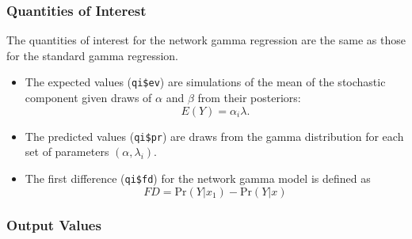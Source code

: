 \subsubsection{Quantities of Interest} 
The quantities of interest for the network gamma regression are the same as those for the standard gamma regression.  
\begin{itemize} 
\item The expected values ({\tt qi\$ev}) are simulations of the mean of the stochastic component given draws of $\alpha$ and $\beta$ from their posteriors:    
\begin{equation*} 
E(Y) = \alpha_i \lambda. 
\end{equation*} 
 
\item The predicted values ({\tt qi\$pr}) are draws from the gamma distribution for each set of parameters $(\alpha, \lambda_i)$.  
 
\item The first difference ({\tt qi\$fd}) for the network gamma model is defined as  
\begin{equation*} 
FD = \text{Pr}(Y | x_{1}) - \text{Pr}(Y | x) 
\end{equation*} 
\end{itemize} 
 
 
\subsubsection{Output Values} 
 

